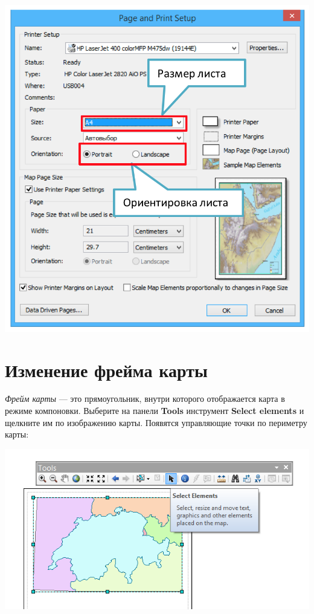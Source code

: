 \documentclass[]{book}
\theoremstyle{definition}
\theoremstyle{definition}
\theoremstyle{definition}
\theoremstyle{remark}
\begin{document}
\includegraphics{images/Appendix/image52.png}

\hypertarget{--}{%
\section{Изменение фрейма карты}\label{--}}

\emph{Фрейм карты} --- это прямоугольник, внутри которого отображается
карта в режиме компоновки. Выберите на панели \textbf{Tools} инструмент
\textbf{Select elements} и щелкните им по изображению карты. Появятся
управляющие точки по периметру карты:

\includegraphics{images/Appendix/image53.png}
\end{document}
